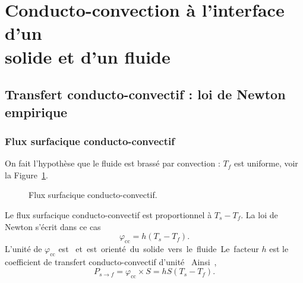 \section{Conducto-convection à l'interface d'un\\solide et d'un fluide}

    \subsection{Transfert conducto-convectif : loi de Newton empirique}

        \subsubsection{Flux surfacique conducto-convectif}

            On fait l'hypothèse que le fluide est brassé par convection : $T_{f}$ est uniforme, voir la Figure~\ref{fig:transfert_conducto_convectif_fluide_brasse}.

            \begin{figure}
                \centering
                \caption{Flux surfacique conducto-convectif.}    
                \label{fig:transfert_conducto_convectif_fluide_brasse}
            \end{figure}

            Le flux surfacique conducto-convectif est proportionnel à $T_s-T_f$. La loi de Newton s'écrit dans ce cas
            \begin{equation*}
                \boxed{
                    \varphi_{\text{cc}}=h\left(T_s-T_f\right).
                }
            \end{equation*}
            L'unité de $\varphi_{\text{cc}}$ est \si[]{\watt\per\metre\square} et est orienté du solide vers le fluide. Le facteur $h$ est le coefficient de transfert conducto-convectif d'unité \si[]{\watt\per\metre\square\per\kelvin}.
            Ainsi,
            \begin{equation*}
                \boxed{
                    P_{s\to f}=\varphi_{\text{cc}}\times S=hS\left(T_s-T_f\right).
                }
            \end{equation*}

